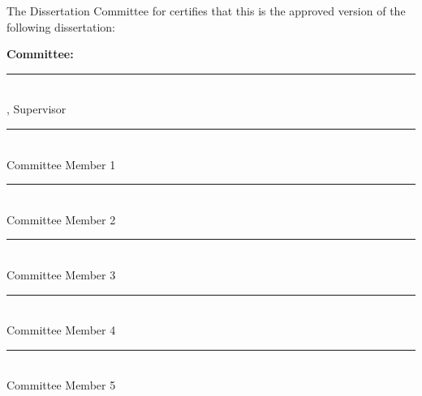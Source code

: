 \thispagestyle{empty} %
\makeatletter
\begin{center}
The Dissertation Committee for \@author\space certifies that this is the approved version of the following dissertation:

\vspace{1cm}
\textbf{
\large
\@title
}
\end{center}

\vspace{2cm}
\begin{flushright}
\textbf{Committee:}\hspace{.6\textwidth} \vspace{1cm}

\rule{.75\textwidth}{.5pt} \\
\supervisor, Supervisor\\
\vspace{1em}
\rule{.75\textwidth}{.5pt} \\
 Committee Member 1\\
\vspace{1em}

\rule{.75\textwidth}{.5pt} \\
 Committee Member 2\\
\vspace{1em}

\rule{.75\textwidth}{.5pt} \\
 Committee Member 3\\
\vspace{1em}

\rule{.75\textwidth}{.5pt} \\
Committee Member 4\\
\vspace{1em}

\rule{.75\textwidth}{.5pt} \\
Committee Member 5\\
\end{flushright}

